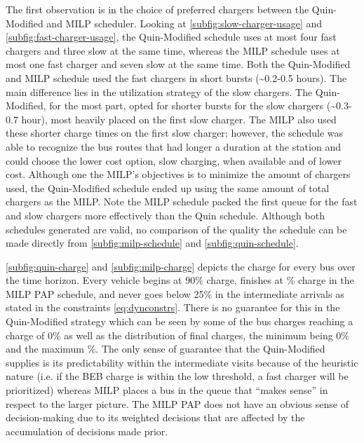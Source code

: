 \documentclass[utf8]{FrontiersinHarvard}
\newcommand{\bcharge}{0.7 }                                                     %
\newcommand{\mincharge}{25\% }                                                  %
\newcommand{\batsize}{388 }                                                     %
\begin{document}
The first observation is in the choice of preferred chargers between the Quin-Modified and MILP scheduler. Looking at
\autoref{subfig:slow-charger-usage} and \autoref{subfig:fast-charger-usage}, the Quin-Modified schedule uses at most
four fast chargers and three slow at the same time, whereas the MILP schedule uses at most one fast charger and seven
slow at the same time. Both the Quin-Modified and MILP schedule used the fast chargers in short bursts (\textasciitilde{}0.2-0.5 hours).
The main difference lies in the utilization strategy of the slow chargers. The Quin-Modified, for the most part, opted
for shorter bursts for the slow chargers (\textasciitilde{}0.3-0.7 hour), most heavily placed on the first slow charger. The MILP also
used these shorter charge times on the first slow charger; however, the schedule was able to recognize the bus routes
that had longer a duration at the station and could choose the lower cost option, slow charging, when available and of
lower cost. Although one the MILP's objectives is to minimize the amount of chargers used, the Quin-Modified schedule
ended up using the same amount of total chargers as the MILP. Note the MILP schedule packed the first queue for the fast
and slow chargers more effectively than the Quin schedule. Although both schedules generated are valid, no comparison of
the quality the schedule can be made directly from \autoref{subfig:milp-schedule} and \autoref{subfig:quin-schedule}.

\autoref{subfig:quin-charge} and \autoref{subfig:milp-charge} depicts the charge for every bus over the time horizon.
Every vehicle begins at 90\% charge, finishes at \fpeval{\bcharge *100}\% charge in the MILP PAP schedule, and never goes
below \mincharge in the intermediate arrivals as stated in the constraints \autoref{eq:dynconstrs}. There is no
guarantee for this in the Quin-Modified strategy which can be seen by some of the bus charges reaching a charge of 0\% as
well as the distribution of final charges, the minimum being 0\% and the maximum  \fpeval{ trunc(\fpeval{368 /
\batsize * 100}, 3) }\%. The only sense of guarantee that the Quin-Modified supplies is its predictability within the
intermediate visits because of the heuristic nature (i.e. if the BEB charge is within the low threshold, a fast charger
will be prioritized) whereas MILP places a bus in the queue that ``makes sense'' in respect to the larger picture. The
MILP PAP does not have an obvious sense of decision-making due to its weighted decisions that are affected by the
accumulation of decisions made prior.
\end{document}
